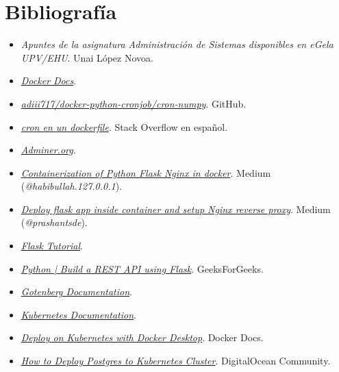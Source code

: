 \documentclass{report}
\begin{document}
    \chapter{Bibliografía}
        \begin{itemize}
            \item \textit{Apuntes de la asignatura Administración de Sistemas disponibles en eGela UPV/EHU}. Unai López Novoa.
            \item \href{https://docs.docker.com}{\textit{Docker Docs}}.
            \item \href{https://github.com/adiii717/docker-python-cronjob/tree/master/cron-numpy}{\textit{adiii717/docker-python-cronjob/cron-numpy}}. GitHub.
            \item \href{https://es.stackoverflow.com/questions/564186/cron-en-un-dockerfile}{\textit{cron en un dockerfile}}. Stack Overflow en español.
            \item \href{https://www.adminer.org/}{\textit{Adminer.org}}.
            \item \href{https://medium.com/@habibullah.127.0.0.1/containerization-of-python-flask-nginx-in-docker-7c451b3328b7}{\textit{Containerization of Python Flask Nginx in docker}}. Medium (\textit{@habibullah.127.0.0.1}).
            \item \href{https://medium.com/@prashantsde/deploy-flask-app-inside-container-and-setup-nginx-reverse-proxy-ac4407fe07c}{\textit{Deploy flask app inside container and setup Nginx reverse proxy}}. Medium (\textit{@prashantsde}).
            \item \href{https://flask.palletsprojects.com/en/stable/tutorial/}{\textit{Flask Tutorial}}.
            \item \href{https://www.geeksforgeeks.org/python-build-a-rest-api-using-flask)/}{\textit{Python | Build a REST API using Flask}}. GeeksForGeeks.
            \item \href{https://gotenberg.dev/docs/getting-started/introduction}{\textit{Gotenberg Documentation}}.
            \item \href{https://kubernetes.io/docs/home/}{\textit{Kubernetes Documentation}}.
            \item \href{https://docs.docker.com/desktop/features/kubernetes/}{\textit{Deploy on Kubernetes with Docker Desktop}}. Docker Docs.
            \item \href{https://www.digitalocean.com/community/tutorials/how-to-deploy-postgres-to-kubernetes-cluster}{\textit{How to Deploy Postgres to Kubernetes Cluster}}. DigitalOcean Community.

\end{itemize}
\end{document}
